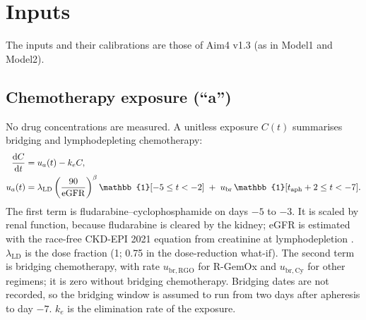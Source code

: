 \documentclass[11pt]{article}
\newcommand{\dd}{\mathrm{d}}
\newcommand{\one}{\mathbb{1}}
\begin{document}
\section{Inputs}
The inputs and their calibrations are those of Aim4 v1.3 (as in Model1 and Model2).

\subsection{Chemotherapy exposure (``a'')}
No drug concentrations are measured. A unitless exposure $C(t)$ summarises bridging and lymphodepleting chemotherapy:
\begin{align}
\frac{\dd C}{\dd t} &= u_a(t) - k_e C, \label{eq:C}\\
u_a(t) &= \lambda_{\mathrm{LD}}\left(\frac{90}{\mathrm{eGFR}}\right)^{\beta}\one[-5\le t<-2]
 \;+\; u_{\mathrm{br}}\,\one[t_{\mathrm{aph}}+\valBrFrom \le t < \valBrTo]. \label{eq:ua}
\end{align}
The first term is fludarabine--cyclophosphamide on days $-5$ to $-3$. It is scaled by renal function, because fludarabine is cleared by the kidney; eGFR is estimated with the race-free CKD-EPI 2021 equation from creatinine at lymphodepletion \citep{inker2021}. $\lambda_{\mathrm{LD}}$ is the dose fraction (1; 0.75 in the dose-reduction what-if). The second term is bridging chemotherapy, with rate $u_{\mathrm{br,RGO}}$ for R-GemOx and $u_{\mathrm{br,Cy}}$ for other regimens; it is zero without bridging chemotherapy. Bridging dates are not recorded, so the bridging window is assumed to run from two days after apheresis to day $-7$. $k_e$ is the elimination rate of the exposure.
\end{document}
